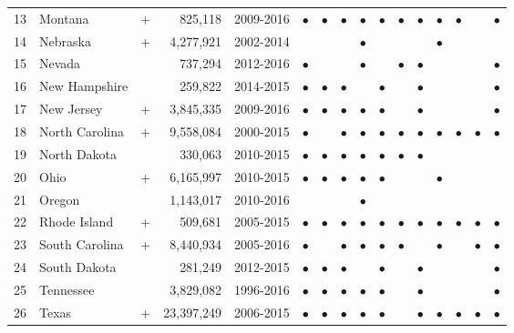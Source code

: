 \begin{table}[ht]
\begin{tabular}{llcrcccccccccccc}
  13 & Montana & + &     825,118 & 2009-2016 & $\bullet$ & $\bullet$ & $\bullet$ & $\bullet$ & $\bullet$ & $\bullet$ & $\bullet$ & $\bullet$ & $\bullet$ &  & $\bullet$ \\ 
  14 & Nebraska & + &   4,277,921 & 2002-2014 &  &  &  & $\bullet$ &  &  &  & $\bullet$ &  &  &  \\ 
  15 & Nevada &  &     737,294 & 2012-2016 & $\bullet$ &  &  & $\bullet$ &  & $\bullet$ & $\bullet$ &  &  &  & $\bullet$ \\ 
  16 & New Hampshire &  &     259,822 & 2014-2015 & $\bullet$ & $\bullet$ & $\bullet$ &  & $\bullet$ &  & $\bullet$ &  &  &  & $\bullet$ \\ 
  17 & New Jersey & + &   3,845,335 & 2009-2016 & $\bullet$ & $\bullet$ & $\bullet$ & $\bullet$ & $\bullet$ &  & $\bullet$ &  &  &  & $\bullet$ \\ 
  18 & North Carolina & + &   9,558,084 & 2000-2015 & $\bullet$ &  & $\bullet$ & $\bullet$ & $\bullet$ & $\bullet$ & $\bullet$ & $\bullet$ & $\bullet$ & $\bullet$ & $\bullet$ \\ 
  19 & North Dakota &  &     330,063 & 2010-2015 & $\bullet$ & $\bullet$ & $\bullet$ & $\bullet$ & $\bullet$ & $\bullet$ & $\bullet$ &  &  &  &  \\ 
  20 & Ohio & + &   6,165,997 & 2010-2015 & $\bullet$ & $\bullet$ & $\bullet$ & $\bullet$ & $\bullet$ &  &  & $\bullet$ &  &  &  \\ 
  21 & Oregon &  &   1,143,017 & 2010-2016 &  &  &  & $\bullet$ &  &  &  &  &  &  &  \\ 
  22 & Rhode Island & + &     509,681 & 2005-2015 & $\bullet$ & $\bullet$ & $\bullet$ & $\bullet$ & $\bullet$ & $\bullet$ & $\bullet$ & $\bullet$ & $\bullet$ & $\bullet$ & $\bullet$ \\ 
  23 & South Carolina & + &   8,440,934 & 2005-2016 & $\bullet$ &  & $\bullet$ & $\bullet$ & $\bullet$ & $\bullet$ &  & $\bullet$ &  & $\bullet$ & $\bullet$ \\ 
  24 & South Dakota &  &     281,249 & 2012-2015 & $\bullet$ & $\bullet$ & $\bullet$ &  & $\bullet$ &  & $\bullet$ &  &  &  & $\bullet$ \\ 
  25 & Tennessee &  &   3,829,082 & 1996-2016 & $\bullet$ & $\bullet$ & $\bullet$ & $\bullet$ & $\bullet$ &  & $\bullet$ &  &  &  & $\bullet$ \\ 
  26 & Texas & + &  23,397,249 & 2006-2015 & $\bullet$ & $\bullet$ & $\bullet$ & $\bullet$ & $\bullet$ &  & $\bullet$ & $\bullet$ & $\bullet$ & $\bullet$ & $\bullet$ \\ 

\end{tabular}
\end{table}
